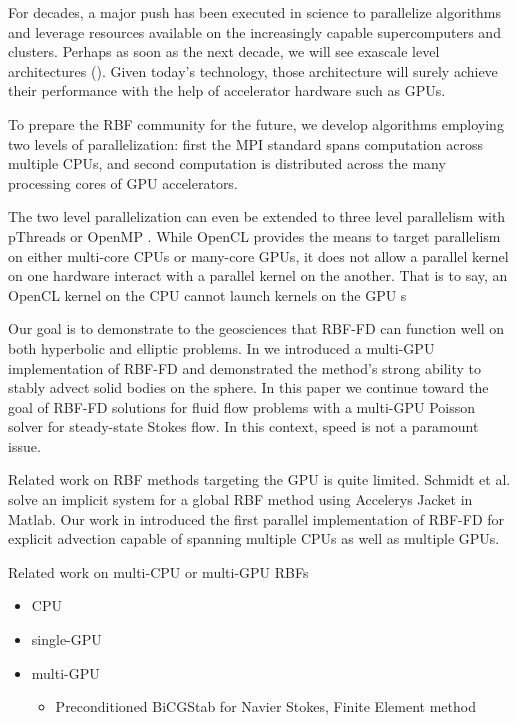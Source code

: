 For decades, a major push has been executed in science to parallelize algorithms and leverage resources available on the increasingly capable supercomputers and clusters. Perhaps as soon as the next decade, we will see exascale level architectures (\cite{ExaScaleRef}). Given today's technology, those architecture will surely achieve their performance with the help of accelerator hardware such as GPUs. 

To prepare the RBF community for the future, we develop algorithms employing two levels of parallelization: first the MPI standard spans computation across multiple CPUs, and second computation is distributed across the many processing cores of GPU accelerators. 

The two level parallelization can even be extended to three level parallelism with pThreads or OpenMP \cite{NVidia_multi-gpu_example}. While OpenCL provides the means to target parallelism on either multi-core CPUs or many-core GPUs, it does not allow a parallel kernel on one hardware interact with a parallel kernel on the another. That is to say, an OpenCL kernel on the CPU cannot launch kernels on the GPU s 

Our goal is to demonstrate to the geosciences that RBF-FD can function well on both hyperbolic and elliptic problems. In \cite{bolligFlyerErlebacher2011} we introduced a multi-GPU implementation of RBF-FD and demonstrated the method's strong ability to stably advect solid bodies on the sphere. In this paper we continue toward the goal of RBF-FD solutions for fluid flow problems with a multi-GPU Poisson solver for steady-state Stokes flow. In this context, speed is not a paramount issue. 

Related work on RBF methods targeting the GPU is quite limited. Schmidt et al. \cite{Schmidt2009b} solve an implicit system for a global RBF method using Accelerys Jacket in Matlab. Our work in \cite{Bollig2011} introduced the first parallel implementation of RBF-FD for explicit advection capable of spanning multiple CPUs as well as multiple GPUs. 

Related work on multi-CPU or multi-GPU RBFs
\begin{itemize} 
	\item CPU \cite{Yokota2010} \cite{Wildemann2009}
	\item single-GPU \cite{Schmidt2009b}
	\item multi-GPU 
	\begin{itemize} 
	\item Preconditioned BiCGStab for Navier Stokes, Finite Element method \cite{Goeddeke2009a} 
	\end{itemize} 
\end{itemize} 

